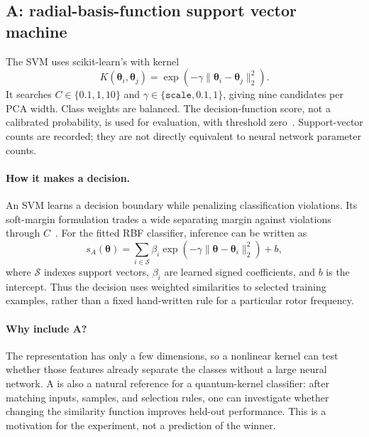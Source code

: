 \documentclass[11pt,letterpaper]{article}
\newcommand{\code}[1]{\texttt{\detokenize{#1}}}
\begin{document}
\subsection{A: radial-basis-function support vector machine}
The SVM uses scikit-learn's \code{SVC} with kernel
\begin{equation}
 K(\boldsymbol{\theta}_i,\boldsymbol{\theta}_j)
 =\exp\!\left(-\gamma\|\boldsymbol{\theta}_i-\boldsymbol{\theta}_j\|_2^2\right).
\end{equation}
It searches $C\in\{0.1,1,10\}$ and
$\gamma\in\{\texttt{scale},0.1,1\}$, giving nine candidates per PCA width.
Class weights are balanced. The decision-function score, not a calibrated
probability, is used for evaluation, with threshold zero~\cite{svc}.
Support-vector counts are recorded; they are not directly equivalent to neural
network parameter counts.

\paragraph{How it makes a decision.}
An SVM learns a decision boundary while penalizing classification violations.
Its soft-margin formulation trades a wide separating margin against violations
through $C$~\cite{svmoriginal}. For the fitted RBF classifier, inference can be
written as
\begin{equation}
 s_A(\boldsymbol{\theta})=
 \sum_{i\in\mathcal{S}}\beta_i
 \exp\!\left(-\gamma\|\boldsymbol{\theta}-\boldsymbol{\theta}_i\|_2^2\right)+b,
\end{equation}
where $\mathcal{S}$ indexes support vectors, $\beta_i$ are learned signed
coefficients, and $b$ is the intercept. Thus the decision uses weighted
similarities to selected training examples, rather than a fixed hand-written
rule for a particular rotor frequency.

\paragraph{Why include A?}
The representation has only a few dimensions, so a nonlinear kernel can test
whether those features already separate the classes without a large neural
network. A is also a natural reference for a quantum-kernel classifier: after
matching inputs, samples, and selection rules, one can investigate whether
changing the similarity function improves held-out performance. This is a
motivation for the experiment, not a prediction of the winner.
\end{document}
